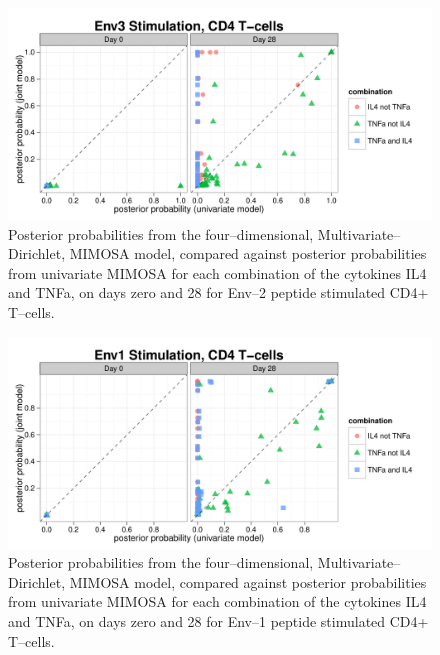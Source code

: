 \documentclass[11pt]{article}
\begin{document}
\begin{figure}[htbp] %
   \centering
   \includegraphics[width=6in]{Figures/Polyfunctionality_ggplot2} 
   \caption{Posterior probabilities from the four--dimensional, Multivariate--Dirichlet, MIMOSA model, compared against posterior probabilities from univariate MIMOSA for each combination of the cytokines IL4 and TNFa, on days zero and 28 for Env--2 peptide stimulated CD4+ T--cells.}
   \label{fig:polyfunctionality}
\end{figure}

\begin{figure}[htbp] %
   \centering
   \includegraphics[width=6in]{Figures/Polyfunctionality_Env1} 
   \caption{Posterior probabilities from the four--dimensional, Multivariate--Dirichlet, MIMOSA model, compared against posterior probabilities from univariate MIMOSA for each combination of the cytokines IL4 and TNFa, on days zero and 28 for Env--1 peptide stimulated CD4+ T--cells.}
   \label{fig:polyfunctionalityenv1}
\end{figure}


\renewcommand{\thesection}{S.\arabic{section}}
\renewcommand{\thesubsection}{\thesection.\arabic{subsection}}
\setcounter{section}{0}
\setcounter{subsection}{0}
\end{document}
